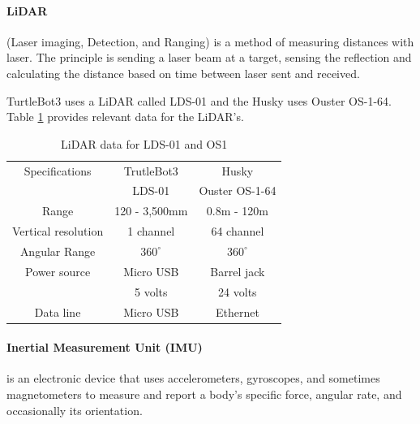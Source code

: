 \paragraph{LiDAR}(Laser imaging, Detection, and Ranging) is a method of measuring distances with laser. The principle is sending a laser beam at a target, sensing the reflection and calculating the distance based on time between laser sent and received. 

TurtleBot3 uses a LiDAR called LDS-01 and the Husky uses Ouster OS-1-64. Table \ref{tab:lidar_data} provides relevant data for the LiDAR's. 

\begin{table}[h]
    \centering
    \begin{tabular}{c|c|c}
        Specifications          & TrutleBot3        & Husky             \\ 
                                & LDS-01            & Ouster OS-1-64    \\ \hline
        Range                   & 120 - 3,500mm     & 0.8m - 120m       \\ \hline
        Vertical resolution     & 1 channel         & 64 channel        \\ \hline
        Angular Range           & $360^\circ$       & $360^\circ$       \\ \hline  
        Power source            & Micro USB         & Barrel jack       \\  
                                & 5 volts           & 24 volts          \\ \hline
        Data line               & Micro USB         & Ethernet          \\       
    \end{tabular}
    \caption{LiDAR data for LDS-01\cite{lds01} and OS1 \cite{OS1Datasheet}}
    \label{tab:lidar_data}
\end{table}

\paragraph{Inertial Measurement Unit (IMU)} is an electronic device that uses accelerometers, gyroscopes, and sometimes magnetometers to measure and report a body's specific force, angular rate, and occasionally its orientation.

